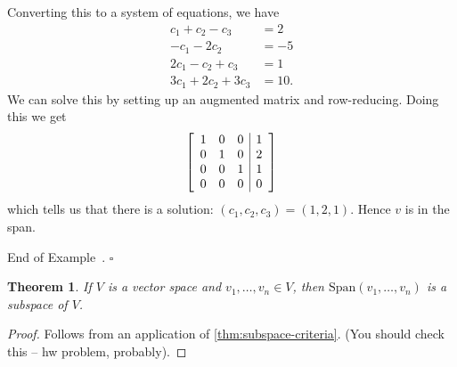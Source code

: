 \documentclass[10pt]{article}
\newenvironment{augmentedmatrix}[1] %
{\left[\begin{array}{#1}}
    {\end{array}\right]}
\newtheorem{theorem}{Theorem}
\theoremstyle{definition}
\newtheorem{example}[theorem]{Example}
\renewenvironment{example}
{\begin{oldexample}}
  {\par\smallskip\hfill   End of Example~\theexample. $\square$    \par\end{oldexample}}
\newcommand{\Span}{\mathrm{Span}} %
\begin{document}
\begin{example}
  Converting this to a system of equations, we have
  \begin{align*}
    c_{1}+c_{2}-c_{3} &= 2\\
    -c_{1}-2c_{2} &= -5\\
    2c_{1}-c_{2}+c_{3} &= 1\\
    3c_{1}+2c_{2}+3c_{3} &= 10.
  \end{align*}
  We can solve this by setting up an augmented matrix and row-reducing. Doing
  this we get
  \begin{equation*}
    \begin{augmentedmatrix}{ccc|c}
      1&0&0&1\\
      0&1&0&2\\
      0&0&1&1\\
      0&0&0&0\\
    \end{augmentedmatrix}
  \end{equation*}
  which tells us that there is a solution: $(c_{1},c_{2},c_{3})= (1,2,1)$.
  Hence $v$ is in the span. 
\end{example}


\begin{theorem}
  If $V$ is a vector space and $v_{1},\ldots,v_{n}\in V$, then
  $\Span(v_{1},\ldots,v_{n})$ is a subspace of $V$.
\end{theorem}
\begin{proof}
  Follows from an application of \cref{thm:subspace-criteria}. (You should
  check this -- hw problem, probably).
\end{proof}
\end{document}

